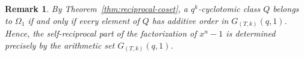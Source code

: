 \documentclass[pdflatex,sn-mathphys-num]{sn-jnl}%
\theoremstyle{thmstyleone}%
\theoremstyle{thmstyletwo}%
\newtheorem{remark}{Remark}%
\theoremstyle{thmstylethree}%
\begin{document}
\begin{remark}
By Theorem~\ref{thm:reciprocal-coset}, a $q^k$-cyclotomic class $Q$ belongs to $\Omega_1$ if and only if every element of $Q$ has additive order in $G_{(T,k)}(q,1)$. Hence, the self-reciprocal part of the factorization of $x^n-1$ is determined precisely by the arithmetic set $G_{(T,k)}(q,1)$.
\end{remark}
\end{document}
